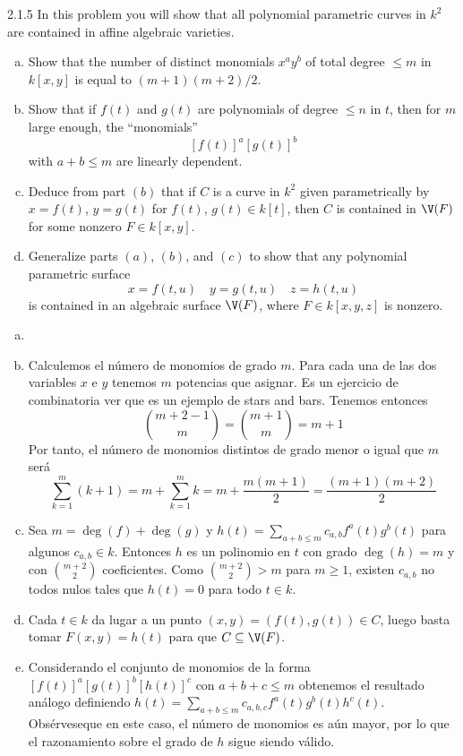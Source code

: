 \documentclass[twoside]{article}
\begin{document}
\begin{ejercicio}{2.1.5}
In this problem you will show that all polynomial parametric curves in $k^2$ are contained in affine algebraic varieties.
\begin{enumerate}[a.]
\item Show that the number of distinct monomials $x^ay^b$ of total degree $≤ m$ in $k[x, y]$ is equal
to $(m + 1)(m + 2)/2$.
\item Show that if $f (t)$ and $g(t)$ are polynomials of degree $≤ n$ in $t$, then for $m$ large enough,
the “monomials”
$$
[f(t)]^a[g(t)]^b
$$
with $a+b\leq m$ are linearly dependent.
\item Deduce from part $(b)$ that if $C$ is a curve in $k^2$ given parametrically by $x = f (t)$, $y = g(t)$ for $f (t)$, $g(t) ∈ k[t]$, then $C$ is contained in $\V(F)$ for some nonzero $F ∈ k[x, y]$.
\item Generalize parts $(a)$, $(b)$, and $(c)$ to show that any polynomial parametric surface
$$
x=f(t,u) \quad y = g(t,u) \quad z=h(t,u)
$$
is contained in an algebraic surface $\V(F)$, where $F ∈ k[x, y, z]$ is nonzero.
\end{enumerate}
\begin{solucion}
\begin{enumerate}[a.]
\item[]
\item Calculemos el número de monomios de grado $m$. Para cada una de las dos variables $x$ e $y$ tenemos $m$ potencias que asignar. Es un ejercicio de combinatoria ver que es un ejemplo de stars and bars. Tenemos entonces 
$$
\binom{m+2-1}{m} = \binom{m+1}{m} = m+1
$$
Por tanto, el número de monomios distintos de grado menor o igual que $m$ será
$$\sum_{k=1}^m (k+1)  = m + \sum_{k=1}^m k = m + \frac{m(m+1)}{2} = \frac{(m+1)(m+2)}{2}
$$

\item Sea $m=\deg(f)+\deg(g)$ y $h(t)=\sum_{a+b\leq m} c_{a,b}f^a(t)g^b(t)$ para algunos $c_{a,b}\in k$. Entonces $h$ es un polinomio en $t$ con grado $\deg(h)=m$ y con $\binom{m+2}{2}$ coeficientes. Como $\binom{m+2}{2}>m$ para $m\geq 1$, existen $c_{a,b}$ no todos nulos tales que $h(t)=0$ para todo $t\in k$.

\item Cada $t\in k$ da lugar a un punto $(x,y)=(f(t),g(t))\in C$, luego basta tomar $F(x,y)=h(t)$ para que $C\subseteq\V(F)$.

\item Considerando el conjunto de monomios de la forma $[f(t)]^a[g(t)]^b[h(t)]^c$ con $a+b+c\leq m$ obtenemos el resultado análogo definiendo $h(t)=\sum_{a+b\leq m} c_{a,b,c}f^a(t)g^b(t)h^c(t).$ Obsérveseque en este caso, el número de monomios es aún mayor, por lo que el razonamiento sobre el grado de $h$ sigue siendo válido.
\end{enumerate}
\end{solucion}
\end{ejercicio}
\end{document}
